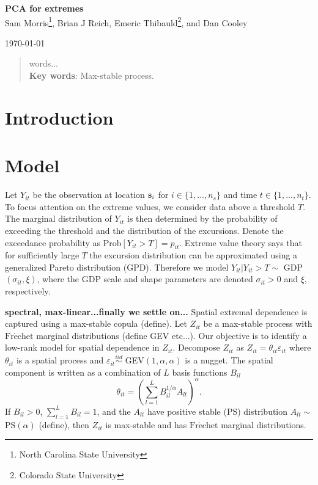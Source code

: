 \documentclass[12pt]{article}
\newcommand{\bs}{ \mbox{\bf s}}
\newcommand{\iid}{\stackrel{iid}{\sim}}
\newcommand{\Frechet}{\mbox{Fr$\acute{\mbox{e}}$chet}}
\newcommand{\beq}{ \begin{equation}}
\newcommand{\eeq}{ \end{equation}}
\begin{document}
\linenumbers
\pagestyle{empty}
\begin{center}
{\Large {\bf PCA for extremes}}\\

{\large Sam Morris\footnote[1]{North Carolina State University}, Brian J Reich\footnotemark[1]{}, Emeric Thibauld\footnote[2]{Colorado State University}, and Dan Cooley\footnotemark[2]{}}

\today
\end{center}


\begin{abstract}
	words...\\
	{\bf Key words}: Max-stable process.

\end{abstract}
\newpage
\pagestyle{plain}
\setcounter{page}{1}

\section{Introduction}\label{s:intro}

\section{Model}\label{s:model}


Let $Y_{it}$ be the observation at location $\bs_i$ for $i\in\{1,...,n_s\}$ and time $t\in\{1,...,n_t\}$.  To focus attention on the extreme values, we consider data above a threshold $T$.  The marginal distribution of $Y_{it}$ is then determined by the probability of exceeding the threshold and the distribution of the excursions. Denote the exceedance probability as Prob$[Y_{it}>T] = p_{it}$.  Extreme value theory says that for sufficiently large $T$ the excursion distribution can be approximated using a generalized Pareto distribution (GPD).  Therefore we model $Y_{it}|Y_{it}>T \sim$ GDP$(\sigma_{it},\xi)$, where the GDP  scale and shape parameters are denoted $\sigma_{it}>0$ and $\xi$, respectively. 

{\bf spectral, max-linear...finally we settle on...} Spatial extremal dependence is captured using a max-stable copula (define).  Let $Z_{it}$ be a max-stable process with $\Frechet$ marginal distributions (define GEV etc...).  Our objective is to identify a low-rank model for spatial dependence in $Z_{it}$.  Decompose  $Z_{it}$ as $Z_{it}=\theta_{it}\varepsilon_{it}$ where $\theta_{it}$ is a spatial process and $\varepsilon_{it}\iid$ GEV$(1,\alpha,\alpha)$ is a nugget.  The spatial component is written as a combination of $L$ basis functions $B_{il}$
\beq \label{theta}
  \theta_{it} = \left(\sum_{l=1}^LB_{il}^{1/\alpha}A_{lt}\right)^{\alpha}. 
\eeq
If $B_{il}>0$, $\sum_{l=1}^LB_{il}=1$, and the $A_{lt}$ have positive stable (PS) distribution $A_{lt}\sim$ PS$(\alpha)$ (define), then $Z_{it}$ is max-stable and has $\Frechet$ marginal distributions.
\end{document}
